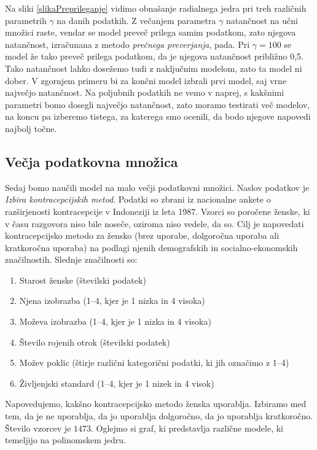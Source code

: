 \documentclass[mat1]{fmfdelo}
\begin{document}
Na sliki \ref{slikaPreprileganje} vidimo obnašanje radialnega jedra pri treh različnih parametrih $\gamma$ na danih podatkih. Z večanjem parametra $\gamma$ natančnost na učni množici raste, vendar se model preveč prilega samim podatkom, zato njegova natančnost, izračunana z metodo \emph{prečnega preverjanja}, pada. Pri $\gamma = 100$ se model že tako preveč prilega podatkom, da je njegova natančnost približno 0,5. Tako natančnost lahko dosežemo tudi z naključnim modelom, zato ta model ni dober. V zgornjem primeru bi za končni model izbrali prvi model, saj vrne največjo natančnost. Na poljubnih podatkih ne vemo v naprej, s kakšnimi parametri bomo dosegli največjo natančnost, zato moramo testirati več modelov, na koncu pa izberemo tistega, za katerega smo ocenili, da bodo njegove napovedi najbolj točne. 


\subsection{Večja podatkovna množica}
Sedaj bomo naučili model na malo večji podatkovni množici. Naslov podatkov je \emph{Izbira kontracepcijskih metod}. Podatki so zbrani iz nacionalne ankete o razširjenosti kontracepcije v Indoneziji iz leta 1987. Vzorci so poročene ženske, ki v času razgovora niso bile noseče, oziroma niso vedele, da so. Cilj je napovedati kontracepcijsko metodo za žensko (brez uporabe, dolgoročna uporaba ali kratkoročna uporaba) na podlagi njenih demografskih in socialno-ekonomskih značilnostih. Slednje značilnosti so:
\begin{enumerate}
	\item
	Starost ženske (številski podatek)
	\item
	Njena izobrazba (1--4, kjer je 1 nizka in 4 visoka)
	\item 
	Moževa izobrazba (1--4, kjer je 1 nizka in 4 visoka)
	\item 
	Število rojenih otrok (številski podatek)
	\item 
	Možev poklic (štirje različni kategorični podatki, ki jih označimo z 1--4)
	\item 
	Življenjski standard (1--4, kjer je 1 nizek in 4 visok)
\end{enumerate}
Napovedujemo, kakšno kontracepcijsko metodo ženska uporablja. Izbiramo med tem, da je ne uporablja, da jo uporablja dolgoročno, da jo uporablja kratkoročno. Število vzorcev je $1473$. Oglejmo si graf, ki predstavlja različne modele, ki temeljijo na polinomskem jedru. 
\end{document}
